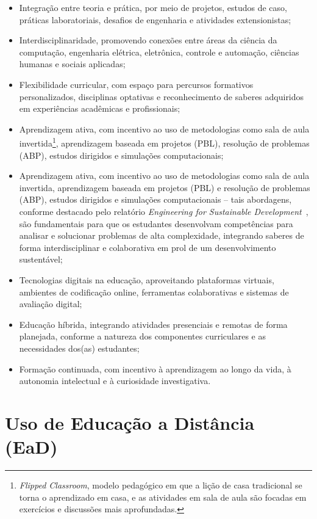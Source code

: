 \begin{itemize}
    \item Integração entre teoria e prática, por meio de projetos, estudos de caso, práticas laboratoriais, desafios de engenharia e atividades extensionistas;
    \item Interdisciplinaridade, promovendo conexões entre áreas da ciência da computação, engenharia elétrica, eletrônica, controle e automação, ciências humanas e sociais aplicadas;
    \item Flexibilidade curricular, com espaço para percursos formativos personalizados, disciplinas optativas e reconhecimento de saberes adquiridos em experiências acadêmicas e profissionais;
    \item Aprendizagem ativa, com incentivo ao uso de metodologias como sala de aula invertida\footnote{\textit{Flipped Classroom}, modelo pedagógico em que a lição de casa tradicional se torna o aprendizado em casa, e as atividades em sala de aula são focadas em exercícios e discussões mais aprofundadas.}, aprendizagem baseada em projetos (PBL), resolução de problemas (ABP), estudos dirigidos e simulações computacionais;
    \item Aprendizagem ativa, com incentivo ao uso de metodologias como sala de aula invertida, aprendizagem baseada em projetos (PBL) e resolução de problemas (ABP), estudos dirigidos e simulações computacionais -- tais abordagens, conforme destacado pelo relatório \textit{Engineering for Sustainable Development}~\cite{UNESCO:Eng4SusDev:2021}, são fundamentais para que os estudantes desenvolvam competências para analisar e solucionar problemas de alta complexidade, integrando saberes de forma interdisciplinar e colaborativa em prol de um desenvolvimento sustentável;
    \item Tecnologias digitais na educação, aproveitando plataformas virtuais, ambientes de codificação online, ferramentas colaborativas e sistemas de avaliação digital;
    \item Educação híbrida, integrando atividades presenciais e remotas de forma planejada, conforme a natureza dos componentes curriculares e as necessidades dos(as) estudantes;
    \item Formação continuada, com incentivo à aprendizagem ao longo da vida, à autonomia intelectual e à curiosidade investigativa.
\end{itemize}

\section{Uso de Educação a Distância (EaD)}
\label{sec:ead}

